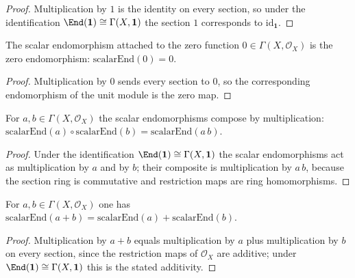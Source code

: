\begin{proof}
  Multiplication by \(1\) is the identity on every section, so under the
  identification \(\End(\mathbf{1}) \cong \Gamma(X, \mathbf{1})\) the section \(1\)
  corresponds to \(\mathrm{id}_{\mathbf{1}}\).
\end{proof}

\begin{lemma}
  \label{lem:gr_scalarEnd_zero}
  The scalar endomorphism attached to the zero function \(0 \in
  \Gamma(X, \mathcal{O}_X)\) is the zero endomorphism:
  \(\mathrm{scalarEnd}(0) = 0\).
\end{lemma}

\begin{proof}
  Multiplication by \(0\) sends every section to \(0\), so the corresponding
  endomorphism of the unit module is the zero map.
\end{proof}

\begin{lemma}
  \label{lem:gr_scalarEnd_comp}
  For \(a, b \in \Gamma(X, \mathcal{O}_X)\) the scalar endomorphisms compose by
  multiplication: \(\mathrm{scalarEnd}(a) \circ \mathrm{scalarEnd}(b) =
  \mathrm{scalarEnd}(a\,b)\).
\end{lemma}
\begin{proof}
  Under the identification \(\End(\mathbf{1}) \cong \Gamma(X, \mathbf{1})\) the
  scalar endomorphisms act as multiplication by \(a\) and by \(b\); their composite
  is multiplication by \(a\,b\), because the section ring is commutative and
  restriction maps are ring homomorphisms.
\end{proof}

\begin{lemma}
  \label{lem:gr_scalarEnd_add}
  For \(a, b \in \Gamma(X, \mathcal{O}_X)\) one has \(\mathrm{scalarEnd}(a + b) =
  \mathrm{scalarEnd}(a) + \mathrm{scalarEnd}(b)\).
\end{lemma}
\begin{proof}
  Multiplication by \(a + b\) equals multiplication by \(a\) plus multiplication by
  \(b\) on every section, since the restriction maps of \(\mathcal{O}_X\) are additive;
  under \(\End(\mathbf{1}) \cong \Gamma(X, \mathbf{1})\) this is the stated additivity.
\end{proof}

